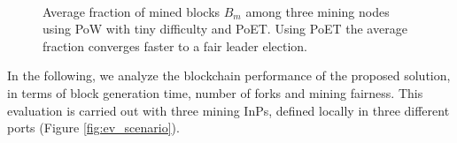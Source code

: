 \begin{figure}[bth]
	\myfloatalign
	 \quad
	 \\
	\caption{Average fraction of mined blocks $B_m$ among three mining nodes using PoW with tiny difficulty and PoET. Using PoET the average fraction converges faster to a fair leader election.}
	\label{fig:fairness}
\end{figure}

In the following, we analyze the blockchain performance of the proposed solution, in terms of block generation time, number of forks and mining fairness. This evaluation is carried out with three mining InPs, defined locally in three different ports (Figure \ref{fig:ev_scenario}).

